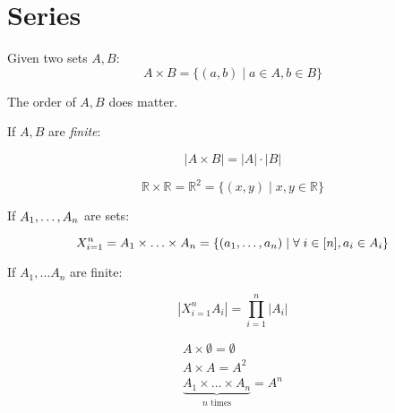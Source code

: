 \documentclass[00_complete]{subfiles}
\begin{document}
\section{Series}

\begin{definition}
Given two sets $A,B$:
$$A \times B = \{(a,b) \mid a \in A, b \in B\}$$
\begin{note}
The order of $A, B$ does matter.
\end{note}
\end{definition}

If $A, B$ are \emph{finite}:

$$|A \times B| = |A| \cdot |B|$$

\begin{definition}[Plane]
$$\mathbb{R} \times \mathbb{R} = \mathbb{R}^2 = \{(x,y) \mid x, y \in \mathbb{R}\}$$
\end{definition}

If $A_1, \mathellipsis, A_n$ are sets:

$$X_{i=1}^{n} = A_1 \times \mathellipsis \times A_n = \{(a_1, \mathellipsis,
a_n) \mid \forall \; i \in [n], a_i \in A_i\}$$

If $A_1, \ldots A_n$ are finite:

$$|X_{i=1}^n A_i| = \prod_{i=1}^n |A_i|$$

\begin{definition}[Characteristics]
\begin{gather*}
    A \times \emptyset = \emptyset \\
    A \times A = A^2 \\
    \underbrace{A_1 \times \ldots \times A_n}_{n\text{ times}} = A^n
\end{gather*}
\end{definition}
\end{document}
